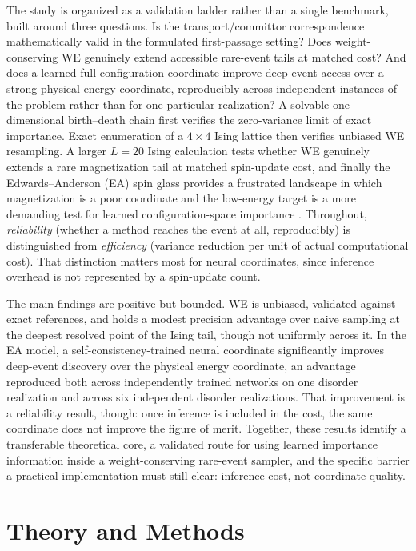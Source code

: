 \documentclass[a4paper,fleqn]{cas-sc}
\begin{document}
The study is organized as a validation ladder rather than a single benchmark, built around
three questions. Is the transport/committor correspondence mathematically valid in the
formulated first-passage setting? Does weight-conserving WE genuinely extend accessible
rare-event tails at matched cost? And does a learned full-configuration coordinate improve
deep-event access over a strong physical energy coordinate, reproducibly across independent
instances of the problem rather than for one particular realization? A solvable
one-dimensional birth--death chain first verifies the zero-variance limit of exact importance.
Exact enumeration of a $4\times4$ Ising lattice then verifies unbiased WE resampling. A larger
$L=20$ Ising calculation tests whether WE genuinely extends a rare magnetization tail at
matched spin-update cost, and finally the Edwards--Anderson (EA) spin glass provides a
frustrated landscape in which magnetization is a poor coordinate and the low-energy target is
a more demanding test for learned configuration-space importance
\citep{ising1925,onsager1944,edwards1975,binder1986}. Throughout, \emph{reliability} (whether
a method reaches the event at all, reproducibly) is distinguished from \emph{efficiency}
(variance reduction per unit of actual computational cost). That distinction matters most for
neural coordinates, since inference overhead is not represented by a spin-update count.

The main findings are positive but bounded. WE is unbiased, validated against exact
references, and holds a modest precision advantage over naive sampling at the deepest
resolved point of the Ising tail, though not uniformly across it. In the EA model, a
self-consistency-trained neural coordinate significantly improves deep-event discovery over
the physical energy coordinate, an advantage reproduced both across independently trained
networks on one disorder realization and across six independent disorder realizations. That
improvement is a reliability result, though: once inference is included in the cost, the same
coordinate does not improve the figure of merit. Together, these results identify a
transferable theoretical core, a validated route for using learned importance information
inside a weight-conserving rare-event sampler, and the specific barrier a practical
implementation must still clear: inference cost, not coordinate quality.

\FloatBarrier

\section{Theory and Methods}\label{sec:methods}
\end{document}

